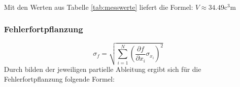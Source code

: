 Mit den Werten aus Tabelle \ref{tab:messwerte} liefert die Formel: $ V \approx 34.49 \unit{\cubic\centi\meter} $

\subsubsection*{Fehlerfortpflanzung}
\begin{equation}
   \sigma_f = \sqrt{ \sum_{i=1}^N \left(\frac{\partial f}{\partial x_i} \sigma_{x_i} \right)^2}
\end{equation}
Durch bilden der jeweiligen partielle Ableitung ergibt sich für die Fehlerfortpflanzung folgende Formel:\\

